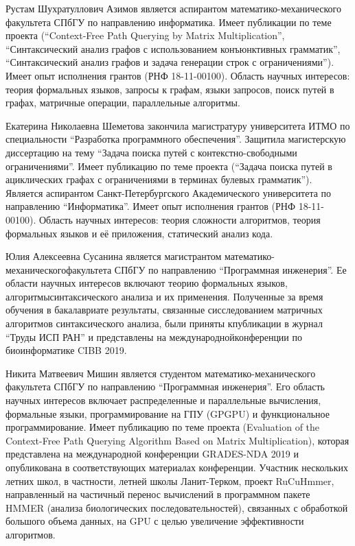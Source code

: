 \documentclass[12pt]{article}  %
\theoremstyle{remark}
\begin{document}
Рустам Шухратуллович Азимов является аспирантом математико-механического факультета СПбГУ по направлению информатика. Имеет публикации по теме проекта (``Context-Free Path Querying by Matrix Multiplication'', ``Синтаксический анализ графов с использованием конъюнктивных грамматик'', ``Синтаксический анализ графов и задача генерации строк с ограничениями''). Имеет опыт исполнения грантов (РНФ 18-11-00100). Область научных интересов: теория формальных языков, запросы к графам, языки запросов, поиск путей в графах, матричные операции, параллельные алгоритмы.

Екатерина Николаевна Шеметова закончила магистратуру университета ИТМО по специальности ``Разработка программного обеспечения''. Защитила магистерскую диссертацию на тему ``Задача поиска путей с контекстно-свободными ограничениями''. Имеет публикацию по теме проекта (``Задача поиска путей в ациклических графах с
ограничениями в терминах булевых грамматик''). Является аспирантом Санкт-Петербургского Академического университета по направлению ``Информатика''. Имеет опыт исполнения грантов (РНФ 18-11-00100).
Область научных интересов: теория сложности алгоритмов, теория формальных языков и её приложения, статический анализ кода.

Юлия Алексеевна Сусанина является магистрантом математико-механическогофакультета СПбГУ по направлению “Программная инженерия”. Ее области научных интересов включают теорию формальных языков, алгоритмысинтаксического анализа и их применения. Полученные за время обучения в бакалавриате результаты, связанные сисследованием матричных алгоритмов синтаксического анализа, были приняты кпубликации в журнал “Труды ИСП РАН” и представлены на международнойконференции по биоинформатике CIBB 2019.

Никита Матвеевич Мишин является студентом математико-механического факультета СПбГУ  по направлению “Программная инженерия”.
Его область научных интересов включает распределенные и параллельные вычисления, формальные языки, программирование на ГПУ (GPGPU) и функциональное программирование.
Имеет публикацию по теме проекта (Evaluation of the Context-Free Path Querying Algorithm Based on Matrix Multiplication),
 которая представлена на международной конференции GRADES-NDA 2019 и опубликована в соответствующих материалах конференции.
Участник нескольких летних школ, в частности, летней школы Ланит-Терком, проект RuCuHmmer,
направленный на частичный перенос вычислений в программном пакете HMMER (анализа биологических последовательностей),
связанных с обработкой большого объема данных, на GPU с целью увеличение эффективности алгоритмов.
\end{document}
